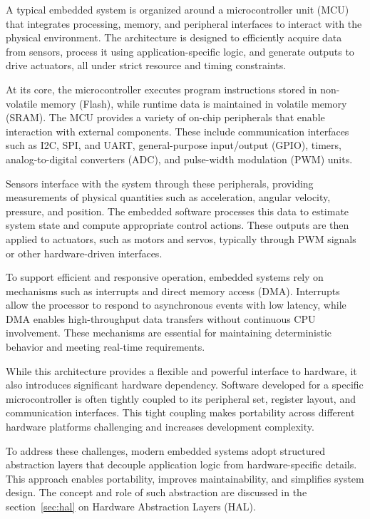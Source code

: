 A typical embedded system is organized around a microcontroller unit (MCU) that integrates processing, memory, and peripheral interfaces to interact with the physical environment. The architecture is designed to efficiently acquire data from sensors, process it using application-specific logic, and generate outputs to drive actuators, all under strict resource and timing constraints.

At its core, the microcontroller executes program instructions stored in non-volatile memory (Flash), while runtime data is maintained in volatile memory (SRAM). The MCU provides a variety of on-chip peripherals that enable interaction with external components. These include communication interfaces such as I2C, SPI, and UART, general-purpose input/output (GPIO), timers, analog-to-digital converters (ADC), and pulse-width modulation (PWM) units.

Sensors interface with the system through these peripherals, providing measurements of physical quantities such as acceleration, angular velocity, pressure, and position. The embedded software processes this data to estimate system state and compute appropriate control actions. These outputs are then applied to actuators, such as motors and servos, typically through PWM signals or other hardware-driven interfaces.

To support efficient and responsive operation, embedded systems rely on mechanisms such as interrupts and direct memory access (DMA). Interrupts allow the processor to respond to asynchronous events with low latency, while DMA enables high-throughput data transfers without continuous CPU involvement. These mechanisms are essential for maintaining deterministic behavior and meeting real-time requirements.

While this architecture provides a flexible and powerful interface to hardware, it also introduces significant hardware dependency. Software developed for a specific microcontroller is often tightly coupled to its peripheral set, register layout, and communication interfaces. This tight coupling makes portability across different hardware platforms challenging and increases development complexity.

To address these challenges, modern embedded systems adopt structured abstraction layers that decouple application logic from hardware-specific details. This approach enables portability, improves maintainability, and simplifies system design. The concept and role of such abstraction are discussed in the section~\ref{sec:hal} on Hardware Abstraction Layers (HAL).

